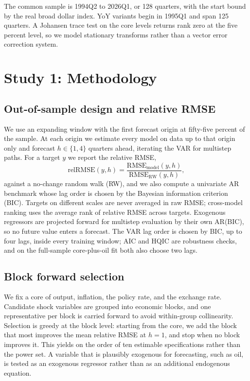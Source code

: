 \documentclass[conference]{IEEEtran}
\begin{document}
The common sample is 1994Q2 to 2026Q1, or 128 quarters, with the start bound by the real broad dollar index. YoY variants begin in 1995Q1 and span 125 quarters. A Johansen trace test on the core levels returns rank zero at the five percent level, so we model stationary transforms rather than a vector error correction system.

\section{Study 1: Methodology}

\subsection{Out-of-sample design and relative RMSE}
We use an expanding window with the first forecast origin at fifty-five percent of the sample. At each origin we estimate every model on data up to that origin only and forecast $h\in\{1,4\}$ quarters ahead, iterating the VAR for multistep paths. For a target $y$ we report the relative RMSE,
\begin{equation}
\mathrm{relRMSE}(y,h) = \frac{\mathrm{RMSE}_{\text{model}}(y,h)}{\mathrm{RMSE}_{\text{RW}}(y,h)},
\end{equation}
against a no-change random walk (RW), and we also compute a univariate AR benchmark whose lag order is chosen by the Bayesian information criterion (BIC). Targets on different scales are never averaged in raw RMSE; cross-model ranking uses the average rank of relative RMSE across targets. Exogenous regressors are projected forward for multistep evaluation by their own AR(BIC), so no future value enters a forecast. The VAR lag order is chosen by BIC, up to four lags, inside every training window; AIC and HQIC are robustness checks, and on the full-sample core-plus-oil fit both also choose two lags.

\subsection{Block forward selection}
We fix a core of output, inflation, the policy rate, and the exchange rate. Candidate shock variables are grouped into economic blocks, and one representative per block is carried forward to avoid within-group collinearity. Selection is greedy at the block level: starting from the core, we add the block that most improves the mean relative RMSE at $h=1$, and stop when no block improves it. This yields on the order of ten estimable specifications rather than the power set. A variable that is plausibly exogenous for forecasting, such as oil, is tested as an exogenous regressor rather than as an additional endogenous equation.
\end{document}
